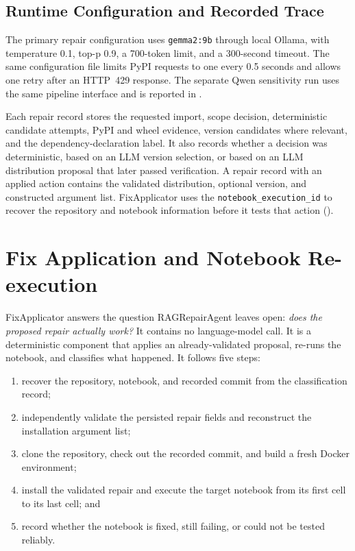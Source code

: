 \subsection{Runtime Configuration and Recorded Trace}

The primary repair configuration uses \texttt{gemma2:9b} through local Ollama,
with temperature 0.1, top-p 0.9, a 700-token limit, and a 300-second timeout.
The same configuration file limits PyPI requests to one every 0.5 seconds and
allows one retry after an HTTP~429 response. The separate Qwen sensitivity run
uses the same pipeline interface and is reported in .

Each repair record stores the requested import, scope decision, deterministic
candidate attempts, PyPI and wheel evidence, version candidates where relevant,
and the dependency-declaration label. It also records whether a decision was
deterministic, based on an LLM version selection, or based on an LLM distribution
proposal that later passed verification. A repair record with an applied action
contains the validated distribution, optional version, and constructed argument
list. FixApplicator uses the \texttt{notebook\_execution\_id} to recover the
repository and notebook information before it tests that action
().

\section{Fix Application and Notebook Re-execution}
\label{sec:m-fixapply}

FixApplicator answers the question RAGRepairAgent leaves open: \emph{does
the proposed repair actually work?} It contains no language-model call. It
is a deterministic component that applies an already-validated proposal,
re-runs the notebook, and classifies what happened. It follows five steps:

\begin{enumerate}
  \item recover the repository, notebook, and recorded commit from the
        classification record;
  \item independently validate the persisted repair fields and reconstruct
        the installation argument list;
  \item clone the repository, check out the recorded commit, and build a
        fresh Docker environment;
  \item install the validated repair and execute the target notebook from its
        first cell to its last cell; and
  \item record whether the notebook is fixed, still failing, or could not be
        tested reliably.
\end{enumerate}

